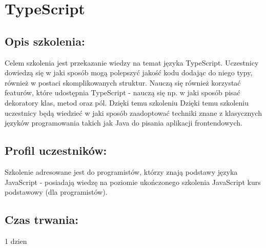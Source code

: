 \documentclass{article}[10pt]
\begin{document}
\newpage


    
	\section{TypeScript}

	\subsection*{Opis szkolenia:}
	\begin{adjustwidth}{2cm}{}
\justifying
		
Celem szkolenia jest przekazanie wiedzy na temat języka TypeScript. Uczestnicy dowiedzą się w jaki sposób mogą polepszyć jakość kodu dodając do niego typy, również w postaci skomplikowanych struktur. Nauczą się również korzystać featurów, które udostępnia TypeScript - nauczą się np. w jaki sposób pisać dekoratory klas, metod oraz pól. Dzięki temu szkoleniu Dzięki temu szkoleniu uczestnicy będą wiedzieć w jaki sposób zaadoptować techniki znane z klasycznych języków programowania takich jak Java do pisania aplikacji frontendowych.

	\end{adjustwidth}
	\subsection*{Profil uczestników:}
\begin{adjustwidth}{2cm}{}
\justifying
	
Szkolenie adresowane jest do programistów, którzy znają podstawy języka JavaScript  - posiadają wiedzę na poziomie ukończonego szkolenia JavaScript kurs podstawowy (dla programistów).
\end{adjustwidth}
	\subsection*{Czas trwania:}
\begin{adjustwidth}{2cm}{}
	1 dzien
\end{adjustwidth}
\end{document}
